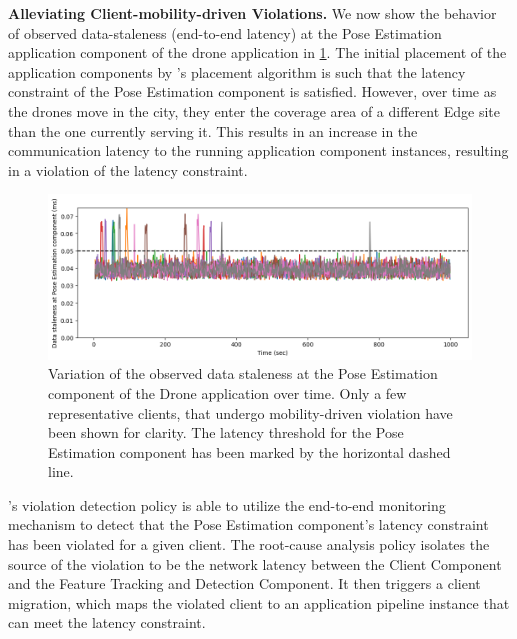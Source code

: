 \par \noindent \textbf{Alleviating Client-mobility-driven Violations.} We now show the behavior of observed data-staleness (end-to-end latency) at the Pose Estimation application component of the drone application in \cref{fig:drone_latencies}. The initial placement of the application components by \oneedge{}'s placement algorithm is such that the latency constraint of the Pose Estimation component is satisfied. However, over time as the drones move in the city, they enter the coverage area of a different Edge site than the one currently serving it. This results in an increase in the communication latency to the running application component instances, resulting in a violation of the latency constraint. 
\begin{figure}[ht]
  \centering
    \includegraphics[width=0.8\columnwidth]{figures/oneedge/drone_latencies.png}
    \caption{Variation of the observed data staleness at the Pose Estimation component of the Drone application over time. Only a few representative clients, that undergo mobility-driven violation have been shown for clarity. The latency threshold for the Pose Estimation component has been marked by the horizontal dashed line.}
    \label{fig:drone_latencies}
\end{figure}
\par \oneedge{}'s violation detection policy is able to utilize the end-to-end monitoring mechanism to detect that the Pose Estimation component's latency constraint has been violated for a given client. The root-cause analysis policy isolates the source of the violation to be the network latency between the Client Component and the Feature Tracking and Detection Component. It then triggers a client migration, which maps the violated client to an application pipeline instance that can meet the latency constraint.\\

